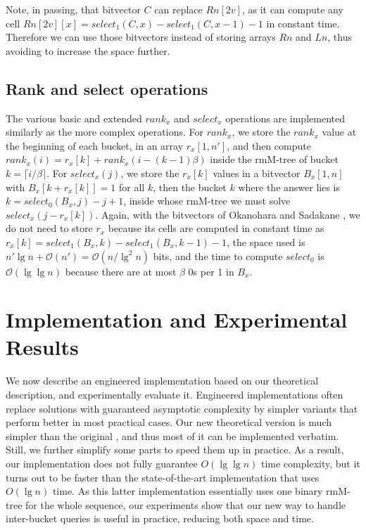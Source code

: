 \documentclass[11pt]{article}
\renewcommand{\log}{\lg}
\newcommand{\0}{\mathit{0}}
\newcommand{\1}{\mathit{1}}
\newcommand{\rank}{\mathit{rank}}
\newcommand{\select}{\mathit{select}}
\newcommand{\Oh}[1]{\mathcal{O}\!\left(#1\right)}
\begin{document}
Note, in passing, that bitvector $C$ can replace $Rn[2v]$, as it can compute
any cell $Rn[2v][x]=\select_1(C,x)-\select_1(C,x-1)-1$ in constant time.
Therefore we can use those bitvectors instead of storing arrays $Rn$ and $Ln$,
thus avoiding to increase the space further.

\subsection{Rank and select operations} \label{sec:rs}

The various basic and extended $\rank_x$ and $\select_x$ operations are 
implemented similarly as the more complex operations. For $\rank_x$, we 
store the $\rank_x$ value at the beginning of each bucket, in an array 
$r_x[1,n']$, and then compute $\rank_x(i)=r_x[k]+\rank_x(i-(k-1)\beta)$ inside 
the rmM-tree of bucket $k = \lceil i/\beta \rceil$. For $\select_x(j)$,
we store the $r_x[k]$ values in a bitvector $B_x[1,n]$ with 
$B_x[k+r_x[k]]=1$ for all $k$, then the bucket $k$ where the answer lies is 
$k=\select_0(B_x,j)-j+1$, inside whose rmM-tree we must solve 
$\select_x(j-r_x[k])$. Again, with the bitvectors of Okanohara and Sadakane
\cite{OS07}, we do not need to store $r_x$ because its cells are computed in
constant time as $r_x[k] = \select_1(B_x,k)-\select_1(B_x,k-1)-1$, the space
used is $n'\log n+\Oh{n'} = \Oh{n/\log^2 n}$ bits, and the time to compute
$\select_0$ is $\Oh{\log\log n}$ because there are at most $\beta$ 0s per 1 in
$B_x$.

\section{Implementation and Experimental Results}

We now describe an engineered implementation based on our theoretical 
description, and experimentally evaluate it. Engineered implementations often
replace solutions with guaranteed asymptotic complexity by simpler variants 
that perform better in most practical cases. Our new theoretical version is
much simpler than the original \cite{NS14}, and thus most of it can be
implemented verbatim. Still, we further simplify some parts to speed them up
in practice. As a result, our implementation does not fully guarantee
$O(\lg\lg n)$ time complexity, but it turns out to be faster than the 
state-of-the-art implementation that uses $O(\log n)$ time. As this latter
implementation essentially uses one binary rmM-tree for the whole sequence, our
experiments show that our new way to handle inter-bucket queries is useful in 
practice, reducing both space and time.
\end{document}
